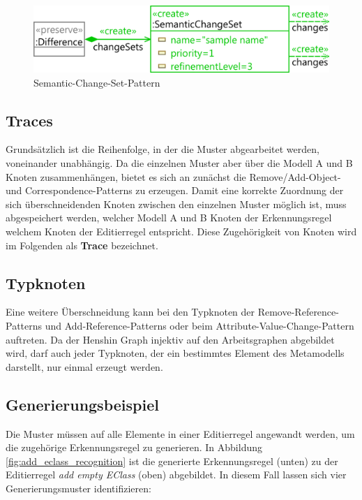 \begin{itemize}
  \begin{figure}[h!]
    \centering
    \includegraphics[scale=0.8]{images/pattern_semantic_change_set.png}
    \caption{Semantic-Change-Set-Pattern}
  \end{figure}
  
\end{itemize}

\subsection{Traces}
\label{traces}

Grundsätzlich ist die Reihenfolge, in der die Muster abgearbeitet werden, voneinander unabhängig.
Da die einzelnen Muster aber über die Modell A und B Knoten zusammenhängen, bietet es sich an zunächst
die Remove/Add-Object- und Correspondence-Patterns zu erzeugen. Damit eine korrekte Zuordnung der
sich überschneidenden Knoten zwischen den einzelnen Muster möglich ist, muss abgespeichert werden,
welcher Modell A und B Knoten der Erkennungsregel welchem Knoten der Editierregel entspricht. Diese
Zugehörigkeit von Knoten wird im Folgenden als \textbf{Trace} bezeichnet.

\subsection{Typknoten}
\label{typknoten}

Eine weitere Überschneidung kann bei den Typknoten der Remove-Reference-Patterns und
Add-Reference-Patterns oder beim Attribute-Value-Change-Pattern auftreten. Da der Henshin Graph
injektiv auf den Arbeitsgraphen abgebildet wird, darf auch jeder Typknoten, der ein bestimmtes
Element des Metamodells darstellt, nur einmal erzeugt werden. 

\subsection{Generierungsbeispiel}
\label{gen_example}

Die Muster müssen auf alle Elemente in einer Editierregel angewandt werden, um die zugehörige
Erkennungsregel zu generieren. In Abbildung \ref{fig:add_eclass_recognition} ist die generierte
Erkennungsregel (unten) zu der Editierregel \textit{add empty EClass} (oben) abgebildet. In diesem
Fall lassen sich vier Generierungsmuster identifizieren:

